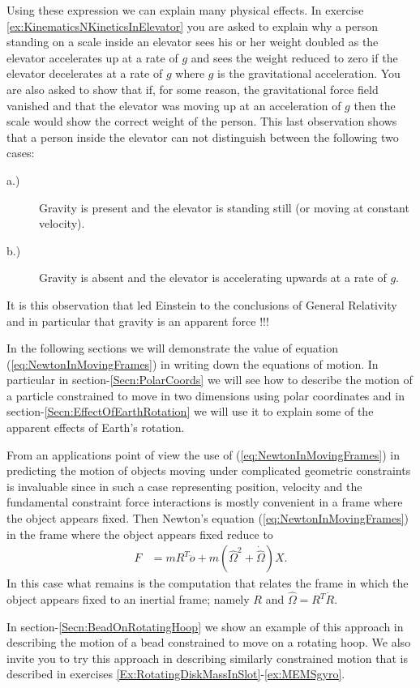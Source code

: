 \documentclass[graybox,envcountchap,sectrefs]{svmonoMuga}
\begin{document}
Using these expression we can explain many physical effects. In exercise \ref{ex:KinematicsNKineticsInElevator} you are asked to explain why a person standing on a scale 
inside an elevator sees his or her weight doubled as the elevator accelerates up at a rate of $g$ and sees the weight reduced to zero if the elevator decelerates at a rate of $g$ 
where $g$ is the gravitational acceleration. You are also asked to show that if, for some reason, the gravitational force field vanished and that the elevator was moving up at an 
acceleration of $g$ then the scale would show the correct weight of the person. This last observation shows that a person inside the elevator can not distinguish between the 
following two cases:
\begin{description}
\item[a.)] Gravity is present and the elevator is standing still (or moving at constant velocity).
\item[b.)] Gravity is absent and the elevator is accelerating upwards at a rate of $g$.
\end{description}
It is this observation that led Einstein to the conclusions of General Relativity and in particular that gravity is an apparent force !!!


In the following sections we will demonstrate the value of equation (\ref{eq:NewtonInMovingFrames}) in writing down the equations of motion. In particular in section-\ref{Secn:PolarCoords} we will see how to describe the motion of a particle constrained to move in two dimensions using polar coordinates and in section-\ref{Secn:EffectOfEarthRotation} we will use it to explain some of the apparent effects of Earth's rotation. 

\begin{svgraybox}
From an applications point of view the use of (\ref{eq:NewtonInMovingFrames}) in predicting the motion of objects moving under complicated geometric constraints is invaluable since in such a case representing position, velocity and the fundamental constraint force interactions is mostly convenient in a frame where the object appears fixed. Then Newton's equation (\ref{eq:NewtonInMovingFrames}) in the frame where the object appears fixed reduce to
\begin{align}
F&= mR^T\ddot{o}+m(\widehat{\Omega}^2 +\dot{\widehat{\Omega}})X.\label{eq:NewtonInBodyFixedFrames}
\end{align}
In this case what remains is the computation that relates the frame in which the object appears fixed to an inertial frame; namely $R$ and $\widehat{\Omega}=R^T\dot{R}$.
\end{svgraybox}
In section-\ref{Secn:BeadOnRotatingHoop} we show an example of this approach in describing the motion of a bead constrained to move on a rotating hoop. We also invite you to try this approach in describing similarly constrained motion that is described in exercises \ref{Ex:RotatingDiskMassInSlot}-\ref{ex:MEMSgyro}.
\end{document}
